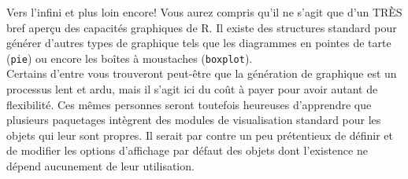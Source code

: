 \begin{moreInfo}{Vers l'infini et plus loin encore!}
	Vous aurez compris qu'il ne s'agit que d'un TRÈS bref aperçu des capacités graphiques de R. Il existe des structures standard pour générer d'autres types de graphique tels que les diagrammes en pointes de tarte (\texttt{pie}) ou encore les boîtes à moustaches (\texttt{boxplot}). \\
	Certains d'entre vous trouveront peut-être que la génération de graphique est un processus lent et ardu, mais il s'agit ici du coût à payer pour avoir autant de flexibilité. Ces mêmes personnes seront toutefois heureuses d'apprendre que plusieurs paquetages intègrent des modules de visualisation standard pour les objets qui leur sont propres.  Il serait par contre un peu prétentieux de définir et de modifier les options d’affichage par défaut des objets dont l’existence ne dépend aucunement de leur utilisation.
\end{moreInfo}